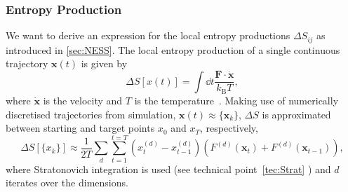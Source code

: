 \subsubsection{Entropy Production}
\label{sec:Sprod}
We want to derive an expression for the local entropy productions $\Delta S_{ij}$ as introduced in \ref{sec:NESS}. The local entropy production of a single continuous trajectory $\mathbf{x}(t)$ is given by 
\begin{equation}
  \label{eq:deltaStraj}
  \Delta S [x (t)] = \int \dd {t} 
  \frac{ \mathbf{F} \cdot \mathbf{ \dot x}}{k_{\mathrm{B}}T},
\end{equation}
where  $\mathbf{ \dot x}$ is the velocity and $T$ is the temperature~\cite{seifert2005entropy}. Making use of numerically discretised trajectories from simulation, $\mathbf{x}(t) \approx \{\mathbf{x}_k\}$, $\Delta S$ is approximated between starting and target points $x_0$ and $x_T$, respectively,
\begin{equation}
 \Delta S[\{x_k \}]\approx \frac{1}{2T} \sum_d \sum_{t=1}^{t=T} \left ( x^{(d)}_t - x^{(d)}_{t-1} \right ) \left ( F^{(d)}({\mathbf{x}}_t) + F^{(d)}({\mathbf{x}}_{t-1}) \right ),
 \label{eq:SprodStr}
\end{equation}
where Stratonovich integration is used (see technical point~\ref{tec:Strat} ) and $d$ iterates over the dimensions.  

